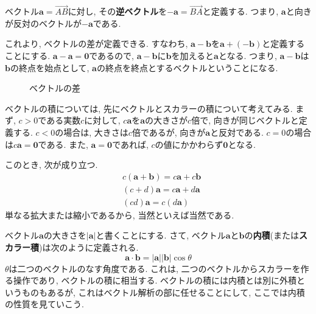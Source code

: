 \documentclass[a4j,dvipdfmx]{jsarticle}
\numberwithin{equation}{section}
\begin{document}
            ベクトル$\bm{a}=\overrightarrow{AB}$に対し, その\textbf{逆ベクトル}を$-\bm{a}=\overrightarrow{BA}$と定義する. つまり, $\bm{a}$と向きが反対のベクトルが$-\bm{a}$である. 

            これより, ベクトルの差が定義できる. すなわち, $\bm{a}-\bm{b}$を$\bm{a}+(-\bm{b})$と定義することにする. $\bm{a}-\bm{a}=\bm{0}$であるので, $\bm{a}-\bm{b}$に$\bm{b}$を加えると$\bm{a}$となる.
            つまり, $\bm{a}-\bm{b}$は$\bm{b}$の終点を始点として, $\bm{a}$の終点を終点とするベクトルということになる.

            \begin{figure}[h]
                \centering
                \caption{ベクトルの差}
            \end{figure}

            ベクトルの積については, 先にベクトルとスカラーの積について考えてみる. まず, $c>0$である実数$c$に対して, $c\bm{a}$を$\bm{a}$の大きさが$c$倍で, 向きが同じベクトルと定義する.
            $c<0$の場合は, 大きさは$c$倍であるが, 向きが$\bm{a}$と反対である. $c=0$の場合は$c\bm{a}=\bm{0}$である. また, $\bm{a}=\bm{0}$であれば, $c$の値にかかわらず$\bm{0}$となる.

            このとき, 次が成り立つ.
            \begin{align}
                &c(\bm{a}+\bm{b})=c\bm{a}+c\bm{b}\\
                &(c+d)\bm{a}=c\bm{a}+d\bm{a}\\
                &(cd)\bm{a}=c(d\bm{a})
            \end{align}
            単なる拡大または縮小であるから, 当然といえば当然である.

            ベクトル$\bm{a}$の大きさを$|\bm{a}|$と書くことにする. さて, ベクトル$\bm{a}$と$\bm{b}$の\textbf{内積}(または\textbf{スカラー積})は次のように定義される.
            \begin{equation}
                \bm{a}\cdot \bm{b}=|\bm{a}||\bm{b}|\cos\theta \label{eq:線形代数:内積の定義}
            \end{equation}
            $\theta$は二つのベクトルのなす角度である. これは, 二つのベクトルからスカラーを作る操作であり, ベクトルの積に相当する. ベクトルの積には内積とは別に外積というものもあるが, これはベクトル解析の部に任せることにして, ここでは内積の性質を見ていこう.
\end{document}

